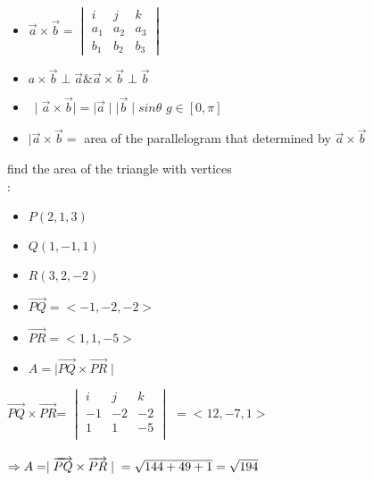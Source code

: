 \begin{itemize}
\item $ {\overrightarrow{a}}\times{\overrightarrow{b}} =
\begin{vmatrix}
{i} & {j} & {k} \\
a_{1} & a_{2} & a_{3} \\
b_{1} & b_{2} & b_{3} 
\end{vmatrix}$
\item $a \times {\overrightarrow{b}} \perp {\overrightarrow{a}} \& {\overrightarrow{a}} \times {\overrightarrow{b}} \perp {\overrightarrow{b}}$
\item $\ \mid{\overrightarrow{a}}\times{\overrightarrow{b}}\mid = \mid{\overrightarrow{a}}\mid  \mid{\overrightarrow{b}}\mid sin \theta$ \hspace{2cm} $g \in [0,\pi ]$
\item $ \mid{\overrightarrow{a}}\times{\overrightarrow{b}} =$ area of the parallelogram that determined by ${\overrightarrow{a}}\times{\overrightarrow{b}}$ 
\end{itemize}
\noindent{\color{smalt(darkpowderblue)}\rule{\linewidth}{.2mm}}
\begin{example}
find the area of the triangle with vertices\\
{} :
\begin{itemize}
\item $P(2,1,3)$
\item $Q(1,-1,1)$
\item $R(3,2,-2)$
\item ${\overrightarrow{PQ}} = < -1,-2,-2 > $
\item  ${\overrightarrow{PR}} = < 1,1,-5 >$
\item $A = \mid{\overrightarrow{PQ}}\times{\overrightarrow{PR}}\mid$
\end{itemize}
${\overrightarrow{PQ}}\times{\overrightarrow{PR}}$=
$\begin{vmatrix}
{i} & {j} & {k} \\
{-1} & {-2} & {-2} \\
{1} &{1} & {-5} \\
\end{vmatrix}$
$= <12,-7,1>$\\ \\
$\Rightarrow A =   \mid{\overrightarrow{PQ}}\times{\overrightarrow{PR}}\mid \\ 
=  \sqrt{144+49+1} \\
= \sqrt{194}$ \\
\end{example}
